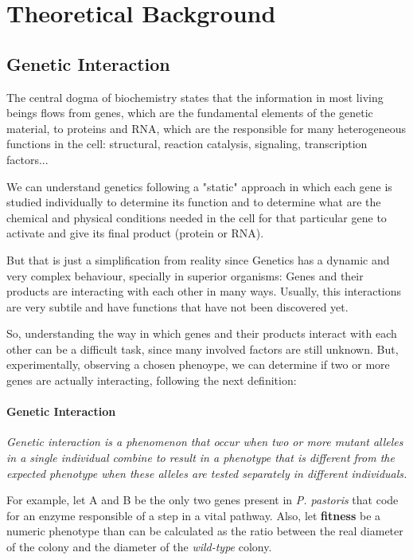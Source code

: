 \documentclass[11pt]{article}
\begin{document}
\section{Theoretical Background}
  \subsection{Genetic Interaction}
    The central dogma of biochemistry states that the information in most living beings flows from genes, which are the fundamental elements of the genetic material, to proteins and RNA, which are the responsible for many heterogeneous functions in the cell: structural, reaction catalysis, signaling, transcription factors...
    
     \par 
    We can understand genetics following a "static" approach in which each gene is studied individually to determine its function and to determine what are the chemical and physical conditions needed in the cell for that particular gene to activate and give its final product (protein or RNA). 

    \par 
    But that is just a simplification from reality since Genetics has a dynamic and very complex behaviour, specially in superior organisms: Genes and their products are interacting with each other in many ways. Usually, this interactions are very subtile and have functions that have not been discovered yet. 
    
    \par 
    So, understanding the way in which genes and their products interact with each other can be a difficult task, since many involved factors are still unknown. But, experimentally, observing a chosen phenoype, we can determine if two or more genes are actually interacting, following the next definition:  
    
    \paragraph{Genetic Interaction} \textit{Genetic interaction is a phenomenon that occur when two or more mutant alleles in a single individual combine to result in a phenotype that is different from the expected phenotype when these alleles are tested separately in different individuals.}

    \par
    For example, let A and B be the only two genes present in \textit{P. pastoris} that code for an enzyme responsible of a step in a vital pathway. Also, let \textbf{fitness} be a numeric phenotype than can be calculated as the ratio between the real diameter of the colony and the diameter of the \textit{wild-type} colony. 
    
\end{document}
